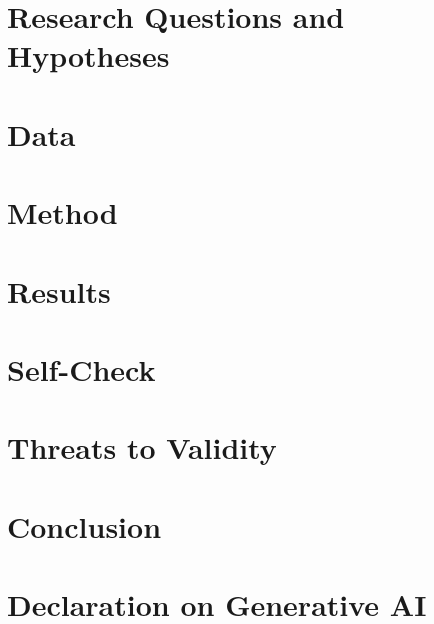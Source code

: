 \documentclass{ceurart}
\begin{document}
\section{Research Questions and Hypotheses}\label{sec:rq}

\section{Data}\label{sec:data}

\section{Method}\label{sec:method}

\section{Results}\label{sec:results}

\section{Self-Check}\label{sec:selfcheck}

\section{Threats to Validity}\label{sec:threats}

\section{Conclusion}\label{sec:conclusion}

\section*{Declaration on Generative AI}

\nocite{ceurws2024genaipolicy,ceurws2024genaitaxonomy}

\end{document}
